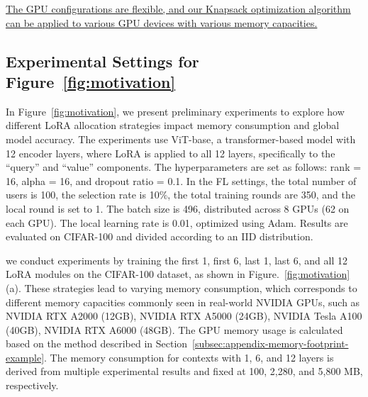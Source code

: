 \documentclass[sigconf]{acmart}
\begin{document}
    \uline{The GPU configurations are flexible, and our Knapsack optimization algorithm can be applied to various GPU devices with various memory capacities.}

    \subsection{Experimental Settings for Figure~\ref{fig:motivation}}\label{subsec:appendix-motivation-settings}

    In Figure~\ref{fig:motivation}, we present preliminary experiments to explore how different LoRA allocation strategies impact memory consumption and global model accuracy. The experiments use ViT-base, a transformer-based model with 12 encoder layers, where LoRA is applied to all 12 layers, specifically to the “query” and “value” components. The hyperparameters are set as follows: rank = 16, alpha = 16, and dropout ratio = 0.1. In the FL settings, the total number of users is 100, the selection rate is 10\%, the total training rounds are 350, and the local round is set to 1. The batch size is 496, distributed across 8 GPUs (62 on each GPU). The local learning rate is 0.01, optimized using Adam. Results are evaluated on CIFAR-100 and divided according to an IID distribution.


    we conduct experiments by training the first 1, first 6, last 1, last 6, and all 12 LoRA modules on the CIFAR-100 dataset, as shown in Figure.~\ref{fig:motivation} (a). These strategies lead to varying memory consumption, which corresponds to different memory capacities commonly seen in real-world NVIDIA GPUs, such as NVIDIA RTX A2000 (12GB), NVIDIA RTX A5000 (24GB), NVIDIA Tesla A100 (40GB), NVIDIA RTX A6000 (48GB). The GPU memory usage is calculated based on the method described in Section~\ref{subsec:appendix-memory-footprint-example}. The memory consumption for contexts with 1, 6, and 12 layers is derived from multiple experimental results and fixed at 100, 2,280, and 5,800 MB, respectively.
\end{document}
